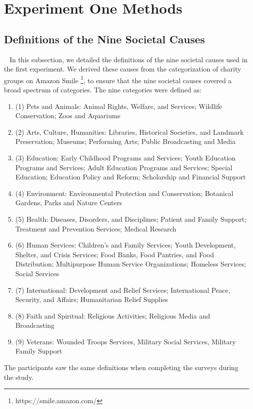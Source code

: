 \appendix

\section{Experiment One Methods}
\subsection{Definitions of the Nine Societal Causes}~\label{cause_def}
In this subsection, we detailed the definitions of the nine societal causes used in the first experiment. We derived these causes from the categorization of charity groups on Amazon Smile \footnote{https://smile.amazon.com/}, to ensure that the nine societal causes covered a broad spectrum of categories. The nine categories were defined as:
\begin{enumerate}[label={},leftmargin=\parindent]
    \item (1) Pets and Animals: Animal Rights, Welfare, and Services; Wildlife Conservation; Zoos and Aquariums
    \item (2) Arts, Culture, Humanities: Libraries, Historical Societies, and Landmark Preservation; Museums; Performing Arts; Public Broadcasting and Media
    \item (3) Education: Early Childhood Programs and Services; Youth Education Programs and Services; Adult Education Programs and Services; Special Education; Education Policy and Reform; Scholarship and Financial Support
    \item (4) Environment: Environmental Protection and Conservation; Botanical Gardens, Parks and Nature Centers
    \item (5) Health: Diseases, Disorders, and Disciplines; Patient and Family Support; Treatment and Prevention Services; Medical Research
    \item (6) Human Services: Children's and Family Services; Youth Development, Shelter, and Crisis Services; Food Banks, Food Pantries, and Food Distribution; Multipurpose Human Service Organizations; Homeless Services; Social Services
    \item (7) International: Development and Relief Services; International Peace, Security, and Affairs; Humanitarian Relief Supplies
    \item (8) Faith and Spiritual: Religious Activities; Religious Media and Broadcasting
    \item (9) Veterans: Wounded Troops Services, Military Social Services, Military Family Support
\end{enumerate}
The participants saw the same definitions when completing the surveys during the study.

